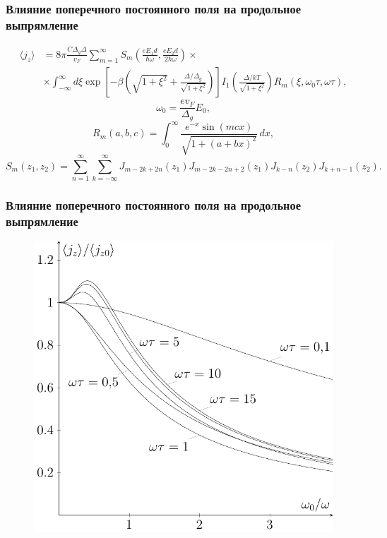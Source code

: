 \documentclass[10pt,pdf,intlimits]{beamer}
\begin{document}
  \begin{frame}
  \frametitle{Влияние поперечного постоянного поля на продольное выпрямление}
      \begin{align}
    \langle j_z \rangle &= 8\pi \frac{C\Delta_g\Delta}{v_F}\sum_{m=1}^\infty
    S_m\left(\frac{eE_1d}{\hbar\omega},\frac{eE_2d}{2\hbar\omega}\right)\times\\&\times
    \int_{-\infty}^\infty d\xi \exp\left[-\beta\left(\sqrt{1+\xi^2} +
    \frac{\Delta/\Delta_g}{\sqrt{1+\xi^2}}\right)\right]
    I_1\left(\frac{\Delta / kT}{\sqrt{1+\xi^2}}\right) R_m(\xi, \omega_0\tau,
    \omega\tau), \nonumber
\end{align}
\begin{equation}
      \omega_0 = \frac{e v_F}{\Delta_g}E_0,
\end{equation}
\begin{equation}
        R_m(a,b,c) = \int_0^\infty \frac{e^{-x}\sin
    (mcx)}{\sqrt{1+\left(a+bx\right)^2}}\,dx,
\end{equation}
\begin{equation}
    S_m(z_1,z_2) = \sum_{n=1}^\infty\sum_{k=-\infty}^\infty
   J_{m-2k+2n}(z_1)J_{m-2k-2n+2}(z_1)J_{k-n}(z_2)J_{k+n-1}(z_2).
\end{equation}
  \end{frame}
  \begin{frame}
    \frametitle{Влияние поперечного постоянного поля на продольное выпрямление}
        \begin{figure}[h]
          \center
          \includegraphics[height=.8\textheight]{../figures/jz.pdf}
      \end{figure}
  \end{frame}
\end{document}
